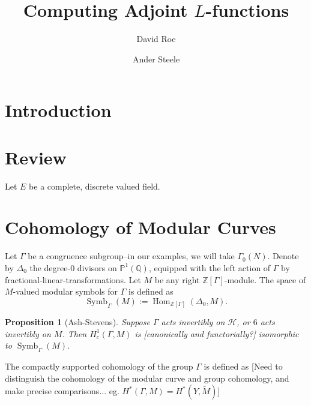 \documentclass[10pt]{amsart}
\title{Computing Adjoint $L$-functions}
\author{David Roe}
\author{Ander Steele}
\theoremstyle{plain}
\newtheorem{proposition}[theorem]{Proposition}
\theoremstyle{definition}
\newcommand{\ZZ}{{\mathbb{Z}}}
\newcommand{\QQ}{{\mathbb{Q}}}
\newcommand{\cH}{\mathcal{H}}
\DeclareMathOperator{\Hom}{Hom}
\DeclareMathOperator{\Symb}{Symb}
\DeclareMathOperator{\BSymb}{BSymb}
\begin{document}
\maketitle

\section{Introduction}

\section{Review}

Let $E$ be a complete, discrete valued field.  

\section{Cohomology of Modular Curves} \label{sec:mod_curve_cohom}
Let $\Gamma$ be a congruence subgroup--in our examples, we will take $\Gamma_0(N)$. Denote by $\Delta_0$ the degree-$0$ divisors on $\mathbb{P}^1(\QQ)$, equipped with the left action of $\Gamma$ by fractional-linear-transformations. Let $M$ be any right $\ZZ[\Gamma]$-module. The space of $M$-valued modular symbols for $\Gamma$ is defined as
\begin{equation}
	\Symb_\Gamma(M) := \Hom_{\ZZ[\Gamma]}(\Delta_0, M).
\end{equation}

\begin{proposition}[Ash-Stevens]
Suppose $\Gamma$ acts invertibly on $\cH$, or $6$ acts invertibly on $M$. Then $H^1_c(\Gamma,M)$ is [canonically and functorially?] isomorphic to $\Symb_\Gamma(M)$.
\end{proposition}

The compactly supported cohomology of the group $\Gamma$ is defined as 
[Need to distinguish the cohomology of the modular curve and group cohomology, and make precise comparisons... eg. $H^*(\Gamma, M) = H^*(Y, \widetilde{M})$]
\end{document}
